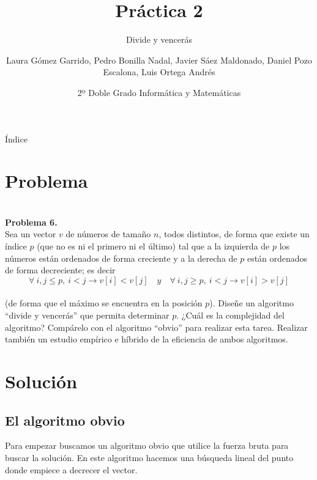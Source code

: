 \documentclass[compress]{beamer}
\title{Práctica 2}                                               %
\subtitle{Divide y vencerás}                                  %
\author{Laura Gómez Garrido, Pedro Bonilla Nadal, Javier Sáez Maldonado, Daniel Pozo Escalona, Luis Ortega Andrés}
\date{2º Doble Grado Informática y Matemáticas}                                                            %
\begin{document}
\begin{frame}
\titlepage
\end{frame}

\begin{frame}{Índice}
  \hypertarget{index}{}
  \tableofcontents
  
\end{frame}

\section{Problema}
\begin{frame}

\textbf{\\Problema 6.\\}
		Sea un vector $v$ de números de tamaño $n$, todos distintos, de forma que existe un índice $p$ (que no es ni el primero ni el último) tal que a la izquierda de $p$ los números están ordenados de forma creciente y a la derecha de $p$ están ordenados de forma decreciente; es decir%
$$\forall \ i,j \leq p , \ i < j \rightarrow v[i] < v[j] \quad y \quad \forall \ i,j \geq p, \ i < j \rightarrow v[i]>v[j]$$\\
(de forma que el máximo se encuentra en la posición $p$). Diseñe un algoritmo ``divide y vencerás'' que permita determinar $p$. ¿Cuál es la complejidad del algoritmo? Compárelo con el algoritmo ``obvio'' para realizar esta tarea. Realizar también un estudio empírico e híbrido de la eficiencia de ambos algoritmos.

\end{frame}	
	
\section{Solución}

\subsection{El algoritmo obvio}

\begin{frame}
	Para empezar buscamos un algoritmo obvio que utilice la fuerza bruta para buscar la solución. En este algoritmo hacemos una búsqueda lineal del punto donde empiece a decrecer el vector.
\end{frame}
\end{document}
